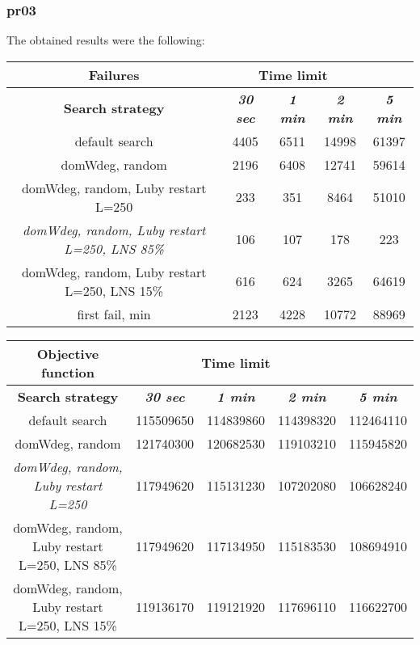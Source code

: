 \subsubsection{pr03}
The obtained results were the following:
{
\renewcommand{\arraystretch}{2}
\begin{longtable}[h]{| c | c | c | c | c |}
    \hline
    \textbf{Failures} & \multicolumn{3}{c}{Time limit} & \\
    \hline
    \textbf{Search strategy} & \textbf{\textit{30 sec}} & \textbf{\textit{1 min}} & \textbf{\textit{2 min}} & \textbf{\textit{5 min}} \\
    \hline
    \endhead
    default search                                         &  4405 &  6511 & 14998 &  61397 \\
    \hline
    domWdeg, random                                        &  2196 &  6408 & 12741 &  59614 \\
    \hline
    domWdeg, random, Luby restart L=250                    &   233 &   351 &  8464 &  51010 \\
    \hline
    \textit{domWdeg, random, Luby restart L=250, LNS 85\%} &   106 &   107 &   178 &    223 \\
    \hline
    domWdeg, random, Luby restart L=250, LNS 15\%          &   616 &   624 &  3265 &  64619 \\
    \hline
    first fail, min                                        &  2123 &  4228 & 10772 &  88969 \\
    \hline
\end{longtable}
}

{
\renewcommand{\arraystretch}{2}
\begin{longtable}[h]{| c | c | c | c | c |}
    \hline
    \textbf{Objective function} & \multicolumn{3}{c}{Time limit} & \\
    \hline
    \textbf{Search strategy} & \textbf{\textit{30 sec}} & \textbf{\textit{1 min}} & \textbf{\textit{2 min}} & \textbf{\textit{5 min}} \\
    \hline
    \endhead
    default search                                & 115509650 & 114839860 & 114398320 & 112464110 \\
    \hline
    domWdeg, random                               & 121740300 & 120682530 & 119103210 & 115945820 \\
    \hline
    \textit{domWdeg, random, Luby restart L=250}  & 117949620 & 115131230 & 107202080 & 106628240 \\
    \hline
    domWdeg, random, Luby restart L=250, LNS 85\% & 117949620 & 117134950 & 115183530 & 108694910 \\
    \hline
    domWdeg, random, Luby restart L=250, LNS 15\% & 119136170 & 119121920 & 117696110 & 116622700 \\
    \hline
\end{longtable}
}

